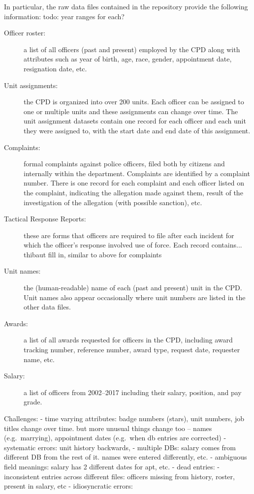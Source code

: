 In particular, the raw data files contained in the repository
provide the following information: {\color{red} todo: year ranges for each?}
\begin{description}
	\item[Officer roster:] a list of all officers (past and present) employed
		by the CPD along with attributes such as year of birth, age, race,
		gender, appointment date, resignation date, etc.
	\item[Unit assignments:] the CPD is organized into over 200 units.
		Each officer can be assigned to one or multiple units and these
		assignments can change over time. The unit assignment datasets contain
		one record for each officer and each unit they were assigned to, with
		the start date and end date of this assignment.
	\item[Complaints:] formal complaints against police officers, filed both by citizens
                and internally within the department. Complaints are identified by a complaint number. 
                There is one record for each complaint and each officer listed on the complaint,
		indicating the allegation made against them, result of the
		investigation of the allegation (with possible sanction), etc.
	\item[Tactical Response Reports:] these are forms that officers are
		required to file after each incident for which the officer's response
		involved use of force. Each record contains... {\color{red} thibaut fill in, similar to above for complaints}
        \item[Unit names:] the (human-readable) name of each (past and present) unit in the CPD. 
                Unit names also appear occasionally where unit numbers are listed in the other data files.
        \item[Awards:] a list of all awards requested for officers in the CPD, including 
                award tracking number, reference number, award type, request date, requester name,
                etc.
        \item[Salary:] a list of officers from 2002--2017 including their salary, position, and pay grade.
\end{description}

Challenges:
- time varying attributes: badge numbers (stars), unit numbers, job titles change over time. but 
more unusual things change too -- names (e.g.~marrying), appointment dates (e.g.~when db entries are corrected)
- systematic errors: unit history backwards, 
- multiple DBs: salary comes from different DB from the rest of it. names were entered differently, etc.
- ambiguous field meanings: salary has 2 different dates for apt, etc.
- dead entries: 
- inconsistent entries across different files: officers missing from history, roster, present in salary, etc
- idiosyncratic errors: 



